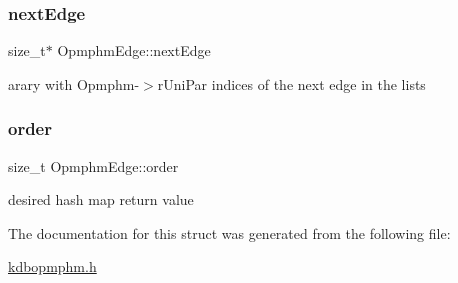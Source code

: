\subsubsection{\texorpdfstring{next\+Edge}{nextEdge}}
{\footnotesize\ttfamily size\+\_\+t$\ast$ Opmphm\+Edge\+::next\+Edge}

arary with Opmphm-\/$>$r\+Uni\+Par indices of the next edge in the lists \mbox{\label{structOpmphmEdge_a6e4538c7c7f5d72f8ecab6aca834e8c8}} 
\subsubsection{\texorpdfstring{order}{order}}
{\footnotesize\ttfamily size\+\_\+t Opmphm\+Edge\+::order}

desired hash map return value 

The documentation for this struct was generated from the following file\+:\begin{DoxyCompactItemize}
\item 
\hyperlink{kdbopmphm_8h}{kdbopmphm.\+h}\end{DoxyCompactItemize}
